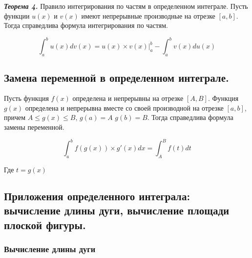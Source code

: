 \documentclass[a4paper,12pt]{article}
\theoremstyle{plain} %
\theoremstyle{definition} %
\theoremstyle{remark} %
\begin{document}
\textit{\textbf{Теорема 4.}} Правило интегрирования по частям в определенном интеграле.
Пусть функции $u(x)$ и $v(x)$ имеют непрерывные производные на отрезке $[a, b]$. Тогда справедлива формула интегрирования по частям.

\[
	\int_a^b u(x) dv(x) = u(x) \times v(x) \Big|_a^b - \int_a^b v(x) du(x)
\]


\newpage
\subsection*{Замена переменной в определенном интеграле.                                                  }
Пусть функция $f(x)$ определена и непрерывны на отрезке $[A, B]$. Функция $g(x)$ определена и непрерывна вместе со своей производной на отрезке $[a, b]$, причем $A \leq g(x) \leq B$, $g(a) = A$ $g(b) = B$. Тогда справедлива формула замены переменной.

\[
	\int_a^b f(g(x)) \times g'(x) dx = \int_A^B f(t) dt
\]

Где $t = g(x)$

\newpage
\subsection*{Приложения определенного интеграла: вычисление длины дуги, вычисление площади плоской фигуры.}

\subsubsection*{ Вычисление длины дуги }
\end{document}

